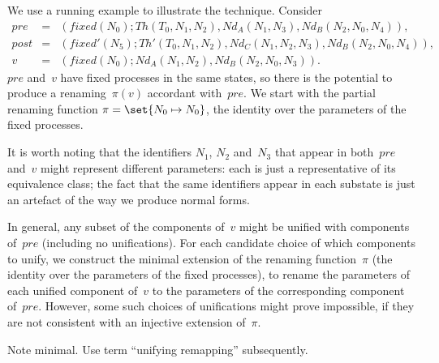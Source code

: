 
\begin{example}
We use a running example to illustrate the technique.  Consider
\begin{eqnarray*}
pre & = &
   (fixed(N_0); Th(T_0, N_1, N_2), Nd_A(N_1, N_3), Nd_B(N_2, N_0, N_4)), 
\\
post & = & 
  (fixed'(N_5); Th'(T_0, N_1, N_2), Nd_C(N_1, N_2, N_3), Nd_B(N_2, N_0, N_4)) ,
\\
v & = & 
  (fixed(N_0); Nd_A(N_1, N_2), Nd_B(N_2, N_0, N_3)).
\end{eqnarray*}
%
$pre$ and~$v$ have fixed processes in the same states, so there is the
potential to produce a renaming~$\pi(v)$ accordant with~$pre$.  We start with
the partial renaming function $\pi = \set{N_0 \mapsto N_0}$, the identity over
the parameters of the fixed processes.

It is worth noting that the identifiers $N_1$, $N_2$ and~$N_3$ that appear in
both~$pre$ and~$v$ might represent different parameters: each is just a
representative of its equivalence class; the fact that the same identifiers
appear in each substate is just an artefact of the way we produce normal
forms.
\end{example}


In general, any subset of the components of~$v$ might be unified with
components of~$pre$ (including no unifications).  For each candidate choice of
which components to unify, we construct the minimal extension of the renaming
function~$\pi$ (the identity over the parameters of the fixed processes), to
rename the parameters of each unified component of~$v$ to the parameters of
the corresponding component of~$pre$.  However, some such choices of
unifications might prove impossible, if they are not consistent with an
injective extension of~$\pi$.

  Note minimal.  Use term ``unifying remapping''
subsequently. 


